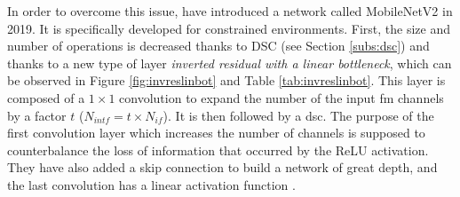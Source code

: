 In order to overcome this issue, \textcite{sandler_mobilenetv2_2019} have introduced a network called MobileNetV2 in 2019. It is specifically developed for constrained environments. First, the size and number of operations is decreased thanks to DSC (see Section \ref{subs:dsc}) and thanks to a new type of layer \textit{inverted residual with a linear bottleneck}, which can be observed in Figure \ref{fig:invreslinbot} and Table \ref{tab:invreslinbot}. This layer is composed of a $1 \times 1$ convolution to expand the number of the input \acrshort{fm} channels by a factor $t$ ($N_{intf} = t \times N_{if}$). It is then followed by a \acrshort{dsc}. The purpose of the first convolution layer which increases the number of channels is supposed to counterbalance the loss of information that occurred by the ReLU activation. They have also added a skip connection to build a network of great depth, and the last convolution has a linear activation function \cite{sandler_mobilenetv2_2019}.
